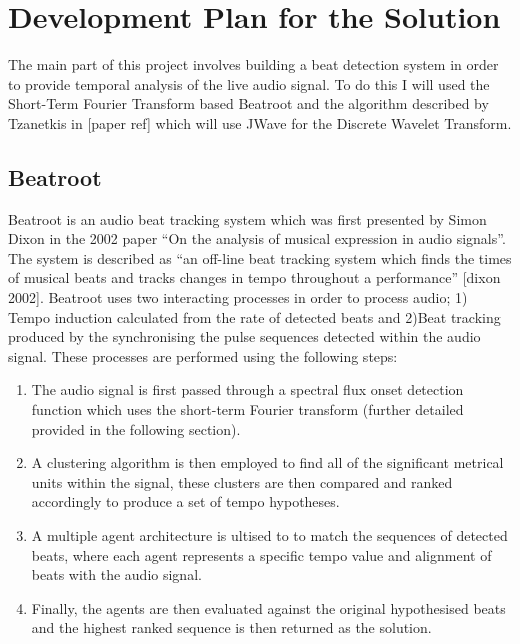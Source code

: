 \documentclass[a4paper, 11pt]{article}
\begin{document}
\maketitle{} 
\section{Development Plan for the Solution}

The main part of this project involves building a beat detection system in order to provide temporal analysis of the live audio signal. To do this I will used the Short-Term Fourier Transform based Beatroot and the algorithm described by Tzanetkis in [paper ref] which will use JWave for the Discrete Wavelet Transform. 

\subsection{Beatroot}
Beatroot is an audio beat tracking system which was first presented by Simon Dixon in the 2002 paper ``On the analysis of musical expression in audio signals''. The system is described as ``an off-line beat tracking system which finds the times of musical beats and tracks changes in tempo throughout a performance'' [dixon 2002]. Beatroot uses two interacting processes in order to process audio; 1) Tempo induction calculated from the rate of detected beats and 2)Beat tracking produced by the synchronising the pulse sequences detected within the audio signal. These processes are performed using the following steps:

\begin{enumerate}
\item The audio signal is first passed through a spectral flux onset detection function which uses the short-term Fourier transform (further detailed provided in the following section). 
\item A clustering algorithm is then employed to find all of the significant metrical units within the signal, these clusters are then compared and ranked accordingly to produce a set of tempo hypotheses.
\item A multiple agent architecture is ultised to to match the sequences of detected beats, where each agent represents a specific tempo value and alignment of beats with the audio signal.
\item Finally, the agents are then evaluated against the original hypothesised beats and the highest ranked sequence is then returned as the solution.
\end{enumerate}
\end{document}
